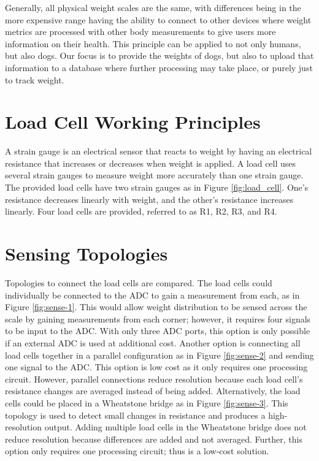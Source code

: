 Generally, all physical weight scales are the same, with differences being in the more expensive range having the ability to connect to other devices where weight metrics are processed with other body measurements to give users more information on their health. This principle can be applied to not only humans, but also dogs. Our focus is to provide the weights of dogs, but also to upload that information to a database where further processing may take place, or purely just to track weight.


\section{Load Cell Working Principles}

A strain gauge is an electrical sensor that reacts to weight by having an electrical resistance that increases or decreases when weight is applied. A load cell uses several strain gauges to measure weight more accurately than one strain gauge. The provided load cells have two strain gauges as in Figure \ref{fig:load_cell}. One’s resistance decreases linearly with weight, and the other’s resistance increases linearly. Four load cells are provided, referred to as R1, R2, R3, and R4.


\section{Sensing Topologies}

Topologies to connect the load cells are compared. The load cells could individually be connected to the ADC to gain a measurement from each, as in Figure \ref{fig:sense-1}. This would allow weight distribution to be sensed across the scale by gaining measurements from each corner; however, it requires four signals to be input to the ADC. With only three ADC ports, this option is only possible if an external ADC is used at additional cost. Another option is connecting all load cells together in a parallel configuration as in Figure \ref{fig:sense-2} and sending one signal to the ADC. This option is low cost as it only requires one processing circuit. However, parallel connections reduce resolution because each load cell's resistance changes are averaged instead of being added. Alternatively, the load cells could be placed in a Wheatstone bridge as in Figure \ref{fig:sense-3}. This topology is used to detect small changes in resistance and produces a high-resolution output. Adding multiple load cells in the Wheatstone bridge does not reduce resolution because differences are added and not averaged. Further, this option only requires one processing circuit; thus is a low-cost solution. 




